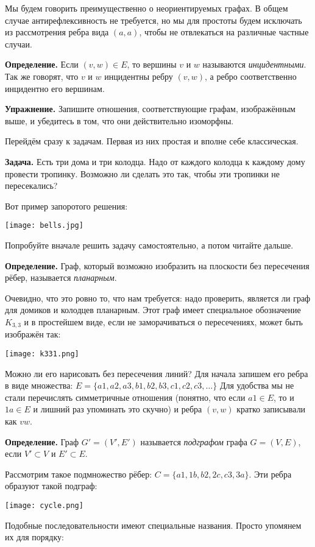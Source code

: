Мы будем говорить преимущественно о неориентируемых графах. В общем случае антирефлексивность не требуется, но мы для простоты будем исключать из рассмотрения ребра вида $(a, a)$, чтобы не отвлекаться на различные частные случаи.

{\bfseries Определение.} Если $(v, w) \in E$, то вершины $v$ и $w$ называются {\slshape инцидентными}. Так же говорят, что $v$ и $w$ инцидентны ребру $(v, w)$, а ребро соответственно инцидентно его вершинам.

{\bfseries Упражнение.} Запишите отношения, соответствующие графам, изображённым выше, и убедитесь в том, что они действительно изоморфны.

Перейдём сразу к задачам. Первая из них простая и вполне себе классическая.

{\bfseries Задача.} Есть три дома и три колодца. Надо от каждого колодца к каждому дому провести тропинку. Возможно ли сделать это так, чтобы эти тропинки не пересекались?

Вот пример запоротого решения:

\texttt{[image: bells.jpg]}

Попробуйте вначале решить задачу самостоятельно, а потом читайте дальше.

{\bfseries Определение.} Граф, который возможно изобразить на плоскости без пересечения рёбер, называется {\slshape планарным}.

Очевидно, что это ровно то, что нам требуется: надо проверить, является ли граф для домиков и колодцев планарным. Этот граф имеет специальное обозначение $K_{3, 3}$ и в простейшем виде, если не заморачиваться о пересечениях, может быть изображён так:

\texttt{[image: k331.png]}

Можно ли его нарисовать без пересечения линий? Для начала запишем его ребра в виде множества: $E = \{a1, a2, a3, b1, b2, b3, c1, c2, c3, \ldots\}$ Для удобства мы не стали перечислять симметричные отношения (понятно, что если $a1\in E$, то и $1a \in E$ и лишний раз упоминать это скучно) и ребра $(v, w)$ кратко записывали как $vw$.

{\bfseries Определение.} Граф $G' = (V', E')$ называется {\slshape подграфом} графа $G = (V, E)$, если $V' \subset V$ и $E' \subset E$.

Рассмотрим такое подмножество рёбер: $C = \{a1, 1b, b2, 2c, c3, 3a\}$. Эти ребра образуют такой подграф:

\texttt{[image: cycle.png]}

Подобные последовательности имеют специальные названия. Просто упомянем их для порядку:

